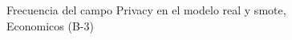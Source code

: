 \begin{figure}[H]
    \centering
    
    \caption{Frecuencia del campo Privacy en el modelo real y smote, Economicos (B-3)}
    \label{frecuency-Privacy-smote-enc}
\end{figure}